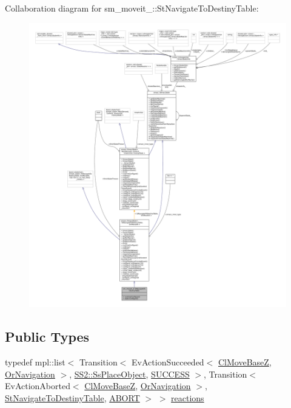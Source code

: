 Collaboration diagram for sm\+\_\+moveit\+\_\+:\+:St\+Navigate\+To\+Destiny\+Table\+:
\nopagebreak
\begin{figure}[H]
\begin{center}
\leavevmode
\includegraphics[width=350pt]{structsm__moveit__4_1_1StNavigateToDestinyTable__coll__graph}
\end{center}
\end{figure}
\subsection*{Public Types}
\begin{DoxyCompactItemize}
\item 
typedef mpl\+::list$<$ Transition$<$ Ev\+Action\+Succeeded$<$ \hyperlink{classcl__move__base__z_1_1ClMoveBaseZ}{Cl\+Move\+BaseZ}, \hyperlink{classsm__moveit__4_1_1OrNavigation}{Or\+Navigation} $>$, \hyperlink{structsm__moveit__4_1_1SS2_1_1SsPlaceObject}{S\+S2\+::\+Ss\+Place\+Object}, \hyperlink{classSUCCESS}{S\+U\+C\+C\+E\+SS} $>$, Transition$<$ Ev\+Action\+Aborted$<$ \hyperlink{classcl__move__base__z_1_1ClMoveBaseZ}{Cl\+Move\+BaseZ}, \hyperlink{classsm__moveit__4_1_1OrNavigation}{Or\+Navigation} $>$, \hyperlink{structsm__moveit__4_1_1StNavigateToDestinyTable}{St\+Navigate\+To\+Destiny\+Table}, \hyperlink{classABORT}{A\+B\+O\+RT} $>$ $>$ \hyperlink{structsm__moveit__4_1_1StNavigateToDestinyTable_ae6317d7146c5e5611ad162f41e80c708}{reactions}
\end{DoxyCompactItemize}
